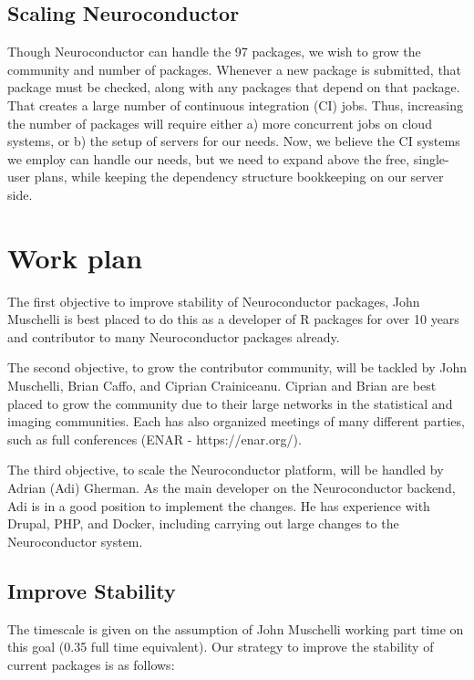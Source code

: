 \documentclass[]{elsarticle} %
\begin{document}
\hypertarget{scaling-neuroconductor}{%
\subsection{Scaling Neuroconductor}\label{scaling-neuroconductor}}

Though Neuroconductor can handle the 97 packages, we wish to grow the community and number of packages. Whenever a new package is submitted, that package must be checked, along with any packages that depend on that package. That creates a large number of continuous integration (CI) jobs. Thus, increasing the number of packages will require either a) more concurrent jobs on cloud systems, or b) the setup of servers for our needs. Now, we believe the CI systems we employ can handle our needs, but we need to expand above the free, single-user plans, while keeping the dependency structure bookkeeping on our server side.

\hypertarget{work-plan}{%
\section{Work plan}\label{work-plan}}

The first objective to improve stability of Neuroconductor packages, John Muschelli is best placed to do this as a developer of R packages for over 10 years and contributor to many Neuroconductor packages already.

The second objective, to grow the contributor community, will be tackled by
John Muschelli, Brian Caffo, and Ciprian Crainiceanu. Ciprian and Brian are best placed to grow the community due to their large networks in the statistical and imaging communities. Each has also organized meetings of many different parties, such as full conferences (ENAR - https://enar.org/).

The third objective, to scale the Neuroconductor platform, will be handled by Adrian (Adi) Gherman. As the main developer on the Neuroconductor backend, Adi is in a good position to implement the changes. He has experience with Drupal, PHP, and Docker, including carrying out large changes to the Neuroconductor system.

\hypertarget{improve-stability}{%
\subsection{Improve Stability}\label{improve-stability}}

The timescale is given on the assumption of John Muschelli working part
time on this goal (0.35 full time equivalent). Our strategy to improve the stability of current packages is as follows:
\end{document}
